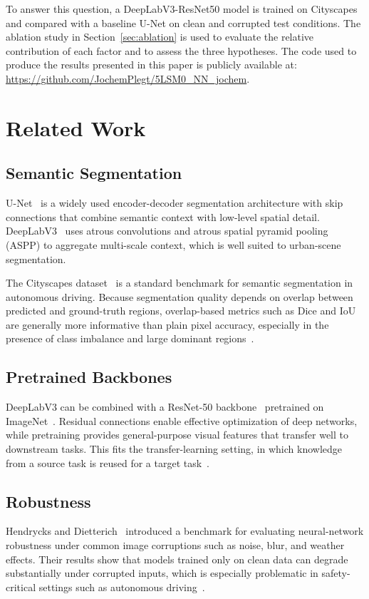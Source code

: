 \documentclass[conference]{IEEEtran}
\begin{document}
To answer this question, a DeepLabV3-ResNet50 model is trained on Cityscapes~\cite{cordts2016cityscapes} and compared with a baseline U-Net on clean and corrupted test conditions. The ablation study in Section~\ref{sec:ablation} is used to evaluate the relative contribution of each factor and to assess the three hypotheses. The code used to produce the results presented in this paper is publicly available at: \url{https://github.com/JochemPlegt/5LSM0_NN_jochem}.

\section{Related Work}

\subsection{Semantic Segmentation}
U-Net~\cite{ronneberger2015unet} is a widely used encoder-decoder segmentation architecture with skip connections that combine semantic context with low-level spatial detail. DeepLabV3~\cite{chen2017deeplab,chen2018deeplabv3plus} uses atrous convolutions and atrous spatial pyramid pooling (ASPP) to aggregate multi-scale context, which is well suited to urban-scene segmentation.

The Cityscapes dataset~\cite{cordts2016cityscapes} is a standard benchmark for semantic segmentation in autonomous driving. Because segmentation quality depends on overlap between predicted and ground-truth regions, overlap-based metrics such as Dice and IoU are generally more informative than plain pixel accuracy, especially in the presence of class imbalance and large dominant regions~\cite{maierhein2024metrics,reinke2024pitfalls}.

\subsection{Pretrained Backbones}
DeepLabV3 can be combined with a ResNet-50 backbone~\cite{he2016resnet} pretrained on ImageNet~\cite{russakovsky2015imagenet}. Residual connections enable effective optimization of deep networks, while pretraining provides general-purpose visual features that transfer well to downstream tasks. This fits the transfer-learning setting, in which knowledge from a source task is reused for a target task~\cite{oquab2014transfer}.

\subsection{Robustness}
Hendrycks and Dietterich~\cite{hendrycks2019robustness} introduced a benchmark for evaluating neural-network robustness under common image corruptions such as noise, blur, and weather effects. Their results show that models trained only on clean data can degrade substantially under corrupted inputs, which is especially problematic in safety-critical settings such as autonomous driving~\cite{grigorescu2020survey}.
\end{document}
